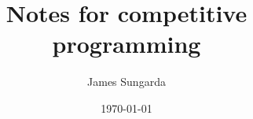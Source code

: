 \documentclass{notes}
\begin{document}
\title{Notes for competitive programming}
\author{James Sungarda}
\date{\today}
\maketitle
\end{document}
